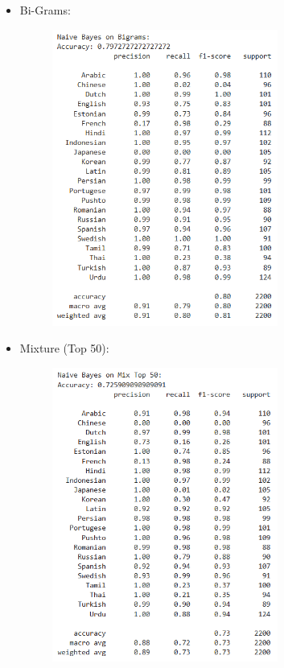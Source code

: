 \begin{itemize}
\begin{itemize}
\begin{figure}[H]
\end{figure}
\clearpage
        \item Bi-Grams:
        \begin{figure}[H]
    \centering
    \includegraphics[width=0.7\textwidth]{img/docspics/Picture43.png}
\end{figure}
\clearpage
        \item Mixture (Top 50):
        \begin{figure}[H]
    \centering
    \includegraphics[width=0.7\textwidth]{img/docspics/Picture44.png}

\end{figure}
\end{itemize}
\end{itemize}
